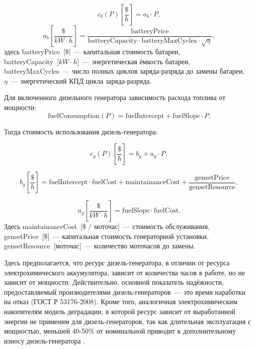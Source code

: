 \begin{equation}\label{f:cb}
c_b(P) \left[\frac{\$}{h} \right] = 
a_b \cdot P,
\end{equation}
\begin{equation}\label{f:ab}
a_b \left[ \frac{\$}{kW\cdot h} \right] =
\frac{\text{batteryPrice}}{\text{batteryCapacity} \cdot \text{batteryMaxCycles} 
\cdot \sqrt{\eta}} ,
\end{equation}
здесь batteryPrice~[\$]~--- капитальная стоимость батареи,\\
batteryCapacity~[$kW\cdot h$]~--- энергетическая ёмкость батареи,\\
batteryMaxCycles~--- число полных циклов заряда-разряда до замены батареи,\\
$\eta$~--- энергетический КПД цикла заряда-разряда.

    
Для включенного дизельного генератора зависимость расхода топлива от мощности:
\begin{equation}
 \text{fuelConsumption} (P) = \text{fuelIntercept} + \text{fuelSlope} \cdot P.
\end{equation}

Тогда стоимость использования дизель-генератора:

\begin{equation}\label{f:cg}
c_g(P) \left[\frac{\$}{h} \right] = b_g + a_g \cdot P,
\end{equation}


\begin{equation}\label{f:bg}
b_g \left[\frac{\$}{h} \right] = 
\text{fuelIntercept} \cdot \text{fuelCost} + \text{maintainanceCost} +
\frac{\text{gensetPrice}}{\text{gensetResource}},
\end{equation}

\begin{equation}\label{f:ag}
a_g \left[ \frac{\$}{kW\cdot h} \right] = 
\text{fuelSlope} \cdot \text{fuelCost}.
\end{equation}
Здесь maintainanceCost~[\$ / моточас]~--- стоимость обслуживания,\\ 
gensetPrice~[\$]~--- капитальная стоимость генераторной установки,\\
gensetResource~[моточас]~--- количество моточасов до замены.

Здесь предполагается, что ресурс дизель-генератора, в отличии от ресурса электрохимического аккумулятора, зависит от количества часов в работе, но не зависит от мощности.
Действительно, основной показатель надёжности, предоставляемый производителями дизель-генераторов~--- это время наработки на отказ   (ГОСТ Р 53176-2008). 
Кроме того, аналогичная электрохимическим накопителям модель деградации, в которой ресурс зависит от выработанной энергии не применим для дизель-генераторов, так как длительная эксплуатация с мощностью, меньшей 40-50\% от номинальной приводит к дополнительному износу дизель-генератора \cite{bleijs1993wear}.


